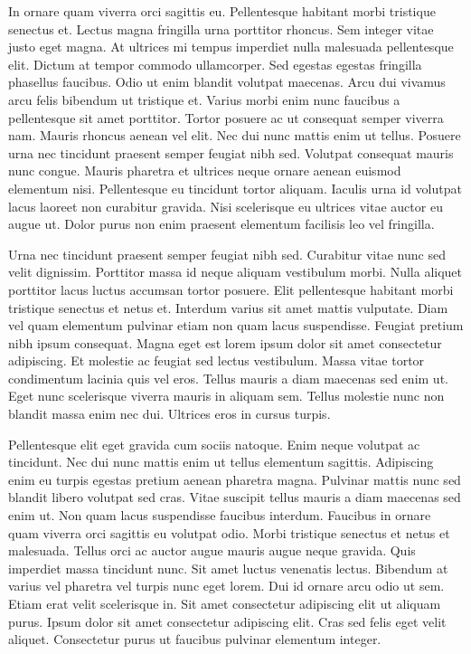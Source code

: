 \documentclass[11pt,a4paper]{article}
\begin{document}
In ornare quam viverra orci sagittis eu. Pellentesque habitant morbi tristique senectus et. Lectus magna fringilla urna porttitor rhoncus. Sem integer vitae justo eget magna. At ultrices mi tempus imperdiet nulla malesuada pellentesque elit. Dictum at tempor commodo ullamcorper. Sed egestas egestas fringilla phasellus faucibus. Odio ut enim blandit volutpat maecenas. Arcu dui vivamus arcu felis bibendum ut tristique et. Varius morbi enim nunc faucibus a pellentesque sit amet porttitor. Tortor posuere ac ut consequat semper viverra nam. Mauris rhoncus aenean vel elit. Nec dui nunc mattis enim ut tellus. Posuere urna nec tincidunt praesent semper feugiat nibh sed. Volutpat consequat mauris nunc congue. Mauris pharetra et ultrices neque ornare aenean euismod elementum nisi. Pellentesque eu tincidunt tortor aliquam. Iaculis urna id volutpat lacus laoreet non curabitur gravida. Nisi scelerisque eu ultrices vitae auctor eu augue ut. Dolor purus non enim praesent elementum facilisis leo vel fringilla.

Urna nec tincidunt praesent semper feugiat nibh sed. Curabitur vitae nunc sed velit dignissim. Porttitor massa id neque aliquam vestibulum morbi. Nulla aliquet porttitor lacus luctus accumsan tortor posuere. Elit pellentesque habitant morbi tristique senectus et netus et. Interdum varius sit amet mattis vulputate. Diam vel quam elementum pulvinar etiam non quam lacus suspendisse. Feugiat pretium nibh ipsum consequat. Magna eget est lorem ipsum dolor sit amet consectetur adipiscing. Et molestie ac feugiat sed lectus vestibulum. Massa vitae tortor condimentum lacinia quis vel eros. Tellus mauris a diam maecenas sed enim ut. Eget nunc scelerisque viverra mauris in aliquam sem. Tellus molestie nunc non blandit massa enim nec dui. Ultrices eros in cursus turpis.

Pellentesque elit eget gravida cum sociis natoque. Enim neque volutpat ac tincidunt. Nec dui nunc mattis enim ut tellus elementum sagittis. Adipiscing enim eu turpis egestas pretium aenean pharetra magna. Pulvinar mattis nunc sed blandit libero volutpat sed cras. Vitae suscipit tellus mauris a diam maecenas sed enim ut. Non quam lacus suspendisse faucibus interdum. Faucibus in ornare quam viverra orci sagittis eu volutpat odio. Morbi tristique senectus et netus et malesuada. Tellus orci ac auctor augue mauris augue neque gravida. Quis imperdiet massa tincidunt nunc. Sit amet luctus venenatis lectus. Bibendum at varius vel pharetra vel turpis nunc eget lorem. Dui id ornare arcu odio ut sem. Etiam erat velit scelerisque in. Sit amet consectetur adipiscing elit ut aliquam purus. Ipsum dolor sit amet consectetur adipiscing elit. Cras sed felis eget velit aliquet. Consectetur purus ut faucibus pulvinar elementum integer.
\end{document}
